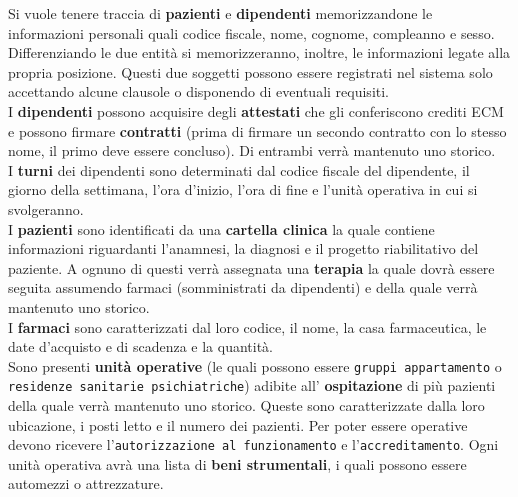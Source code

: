 \documentclass[a4paper, 12pt]{report}
\newenvironment{changemargin}[2]{%
  \begin{list}{}{%
    \setlength{\topsep}{0pt}%
    \setlength{\leftmargin}{#1}%
    \setlength{\rightmargin}{#2}%
    \setlength{\listparindent}{\parindent}%
    \setlength{\itemindent}{\parindent}%
    \setlength{\parsep}{\parskip}%
  }%
  \item[]}{\end{list}}
\begin{document}
\begin{changemargin}{0.5cm}{0.5cm}
        \noindent
        Si vuole tenere traccia di \textbf{pazienti} e \textbf{dipendenti} memorizzandone le informazioni personali
        quali codice fiscale, nome, cognome, compleanno e sesso.
        Differenziando le due entità si memorizzeranno, inoltre, le informazioni legate alla propria posizione.
        Questi due soggetti possono essere registrati nel sistema solo accettando alcune clausole o
        disponendo di eventuali requisiti.\\
        I \textbf{dipendenti} possono acquisire degli \textbf{attestati} che gli conferiscono crediti ECM e possono firmare
        \textbf{contratti} (prima di firmare un secondo contratto con lo stesso nome, il primo deve essere concluso).
        Di entrambi verrà mantenuto uno storico.\\
        I \textbf{turni} dei dipendenti sono determinati dal codice fiscale del dipendente, il giorno della settimana, 
        l'ora d'inizio, l'ora di fine e l'unità operativa in cui si svolgeranno.\\
        I \textbf{pazienti} sono identificati da una \textbf{cartella clinica} la quale contiene informazioni riguardanti
        l'anamnesi, la diagnosi e il progetto riabilitativo del paziente. A ognuno di questi verrà assegnata una 
        \textbf{terapia} la quale dovrà essere seguita assumendo farmaci (somministrati da dipendenti) e della quale
        verrà mantenuto uno storico.\\
        I \textbf{farmaci} sono caratterizzati dal loro codice, il nome, la casa farmaceutica, le date d'acquisto e
        di scadenza e la quantità.\\
        Sono presenti \textbf{unità operative} (le quali possono essere \texttt{gruppi appartamento} o \texttt{residenze
        sanitarie psichiatriche}) adibite all' \textbf{ospitazione} di più pazienti della quale verrà mantenuto uno storico.
        Queste sono caratterizzate dalla loro ubicazione, i posti letto e il numero dei pazienti.
        Per poter essere operative devono ricevere l'\texttt{autorizzazione al funzionamento} e l'\texttt{accreditamento}.
        Ogni unità operativa avrà una lista di \textbf{beni strumentali}, i quali possono essere automezzi o attrezzature.
\end{changemargin}
\end{document}
